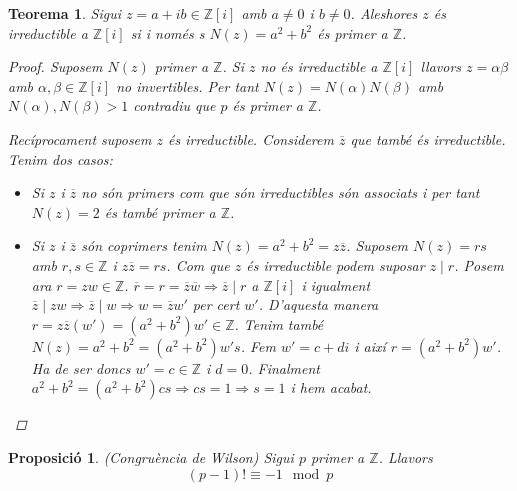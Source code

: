 \documentclass[a4paper,11pt]{report}
\renewcommand{\div}{\mid}
\renewcommand{\bar}{\overline}
\newcommand{\im}{\Rightarrow}
\theoremstyle{theorem}
\newtheorem{proposicio}{\normalfont \sffamily\bfseries Proposició}[section]
\newtheorem{teorema}{\normalfont \sffamily\bfseries Teorema}[section]
\theoremstyle{definition}
\begin{document}
\begin{teorema}
	Sigui $z=a+ib\in\mathbb{Z}[i]$ amb $a\neq 0$ i $b\neq 0$. Aleshores $z$ és irreductible a $\mathbb{Z}[i]$ si i només s $N(z)=a^2+b^2$ és primer a $\mathbb{Z}$.
	\begin{proof}
		Suposem $N(z)$ primer a $\mathbb{Z}$. Si $z$ no és irreductible a $\mathbb{Z}[i]$ llavors $z=\alpha\beta$ amb $\alpha,\beta\in\mathbb{Z}[i]$ no invertibles. Per tant $N(z)=N(\alpha)N(\beta)$ amb $N(\alpha),N(\beta)>1$ contradiu que $p$ és primer a $\mathbb{Z}$.
		
		Recíprocament suposem $z$ és irreductible. Considerem $\bar{z}$ que també és irreductible. Tenim dos casos:
		\begin{itemize}
			\item Si $z$ i $\bar{z}$ no són primers  com que són irreductibles són associats i per tant $N(z)=2$ és també primer a $\mathbb{Z}$.
			\item Si $z$ i $\bar{z}$ són coprimers tenim $N(z)=a^2+b^2=z\bar{z}$. Suposem $N(z)=rs$ amb $r,s\in\mathbb{Z}$ i $z\bar{z}=rs$. Com que $z$ és irreductible podem suposar $z\div r$. Posem ara $r=zw\in\mathbb{Z}$. $\bar{r}=r=\bar{z}\bar{w}\im \bar{z}\div r $ a $\mathbb{Z}[i]$ i igualment $\bar{z}\div zw\im \bar{z}\div w\im w=\bar{z}w'$ per cert $w'$. D'aquesta manera $r=z\bar{z}(w')=(a^2+b^2)w'\in\mathbb{Z}$. Tenim també $N(z)=a^2+b^2=(a^2+b^2)w's$. Fem $w'=c+di$ i així $r=(a^2+b^2)w'$. Ha de ser doncs $w'=c\in\mathbb{Z}$ i $d=0$. Finalment $a^2+b^2=(a^2+b^2)cs\im cs=1\im s=1 $ i hem acabat. 
		\end{itemize}
	\end{proof}
\end{teorema}
\begin{proposicio} (Congruència de Wilson)
	Sigui $p$ primer a $\mathbb{Z}$. Llavors $$(p-1)!\equiv -1 \mod p$$
\end{proposicio}
\end{document}
